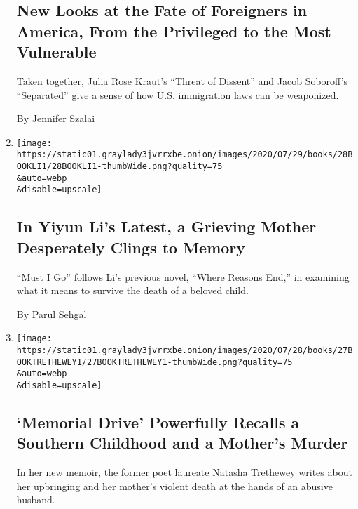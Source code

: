\begin{enumerate}
  \hypertarget{new-looks-at-the-fate-of-foreigners-in-america-from-the-privileged-to-the-most-vulnerable}{%
  \subsection{New Looks at the Fate of Foreigners in America, From the
  Privileged to the Most
  Vulnerable}\label{new-looks-at-the-fate-of-foreigners-in-america-from-the-privileged-to-the-most-vulnerable}}

  Taken together, Julia Rose Kraut's ``Threat of Dissent'' and Jacob
  Soboroff's ``Separated'' give a sense of how U.S. immigration laws can
  be weaponized.

  By Jennifer Szalai
\item
  \href{/2020/07/28/books/review-must-i-go-yiyun-li.html}{}

  \texttt{[image: https://static01.graylady3jvrrxbe.onion/images/2020/07/29/books/28BOOKLI1/28BOOKLI1-thumbWide.png?quality=75\\\&auto=webp\\\&disable=upscale]}

  \hypertarget{in-yiyun-lis-latest-a-grieving-mother-desperately-clings-to-memory}{%
  \subsection{In Yiyun Li's Latest, a Grieving Mother Desperately Clings
  to
  Memory}\label{in-yiyun-lis-latest-a-grieving-mother-desperately-clings-to-memory}}

  ``Must I Go'' follows Li's previous novel, ``Where Reasons End,'' in
  examining what it means to survive the death of a beloved child.

  By Parul Sehgal
\item
  \href{/2020/07/27/books/review-memorial-drive-memoir-natasha-trethewey.html}{}

  \texttt{[image: https://static01.graylady3jvrrxbe.onion/images/2020/07/28/books/27BOOKTRETHEWEY1/27BOOKTRETHEWEY1-thumbWide.png?quality=75\\\&auto=webp\\\&disable=upscale]}

  \hypertarget{memorial-drive-powerfully-recalls-a-southern-childhood-and-a-mothers-murder}{%
  \subsection{`Memorial Drive' Powerfully Recalls a Southern Childhood
  and a Mother's
  Murder}\label{memorial-drive-powerfully-recalls-a-southern-childhood-and-a-mothers-murder}}

  In her new memoir, the former poet laureate Natasha Trethewey writes
  about her upbringing and her mother's violent death at the hands of an
  abusive husband.


\end{enumerate}
